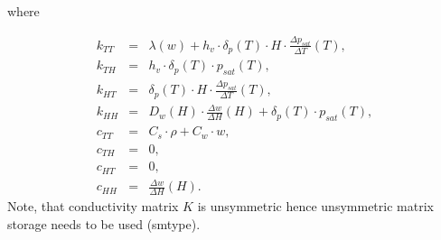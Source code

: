 \documentclass[a4paper]{article}
\newcommand{\bea}{\begin{eqnarray}}
\newcommand{\eea}{\end{eqnarray}}
\newcommand{\tenss}[1]{\mbox{\boldmath$#1$}} %
\begin{document}
\noindent where

\bea
k_{TT} &=& \lambda(w) + h_v \cdot \delta_p(T) \cdot H \cdot  \frac{\Delta p_{sat}}{\Delta T}(T),\\
k_{TH} &=& h_v \cdot \delta_p(T) \cdot p_{sat}(T),\\
k_{HT} &=& \delta_p(T) \cdot H \cdot \frac{\Delta p_{sat}}{\Delta T}(T),\\
k_{HH} &=& D_w(H) \cdot \frac{\Delta w}{\Delta H}(H) + \delta_p(T) \cdot p_{sat}(T),\\
c_{TT} &=& C_s \cdot \rho + C_w \cdot w,\\
c_{TH} &=& 0,\\
c_{HT} &=& 0,\\
c_{HH} &=& \frac{\Delta w}{\Delta H}(H).
\eea
Note, that conductivity matrix \tenss{K} is unsymmetric hence unsymmetric matrix storage needs to be used (smtype).
\end{document}
